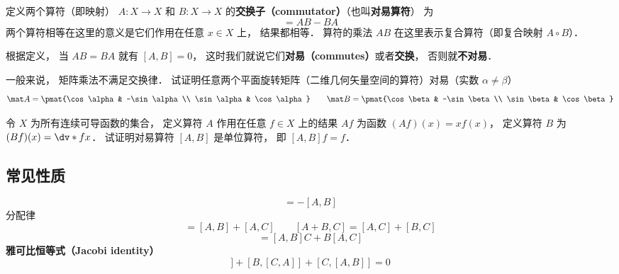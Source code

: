 

定义两个算符（即映射） $A: X\to X$ 和 $B: X\to X$ 的\textbf{交换子（commutator）}（也叫\textbf{对易算符}） 为
\begin{equation}
[A, B] = A B - B A
\end{equation}
两个算符相等在这里的意义是它们作用在任意 $x \in X$ 上， 结果都相等． 算符的乘法 $AB$ 在这里表示复合算符（即复合映射 $A\circ B$）．

根据定义， 当 $A B = B A$ 就有 $[A, B] = 0$， 这时我们就说它们\textbf{对易（commutes）}或者\textbf{交换}， 否则就\textbf{不对易}．

\begin{exercise}{}
一般来说， 矩阵乘法不满足交换律． 试证明任意两个平面旋转矩阵（二维几何矢量空间的算符）对易（实数 $\alpha \ne \beta$）
\begin{equation}
\mat A  = \pmat{\cos\alpha & -\sin\alpha\\ \sin\alpha & \cos\alpha}
\qquad
\mat B  = \pmat{\cos\beta & -\sin\beta\\ \sin\beta & \cos\beta}
\end{equation}
\end{exercise}

\begin{exercise}{}
令 $X$ 为所有连续可导函数的集合， 定义算符 $A$ 作用在任意 $f\in X$ 上的结果 $Af$ 为函数 $(Af)(x) = x f(x)$， 定义算符 $B$ 为 $(Bf)(x) = \dv*{f}{x}$． 试证明对易算符 $[A, B]$ 是单位算符， 即 $[A, B]f = f$．
\end{exercise}

\subsection{常见性质}
\begin{equation}
[B, A] = -[A, B]
\end{equation}
分配律
\begin{equation}
[A, B + C] = [A, B] + [A, C]
\qquad
[A + B, C] = [A, C] + [B, C]
\end{equation}
\begin{equation}
[A, BC] = [A, B]C + B[A, C]
\end{equation}
\textbf{雅可比恒等式（Jacobi identity）}
\begin{equation}
[A, [B, C]] + [B, [C, A]] + [C, [A, B]] = 0
\end{equation}

